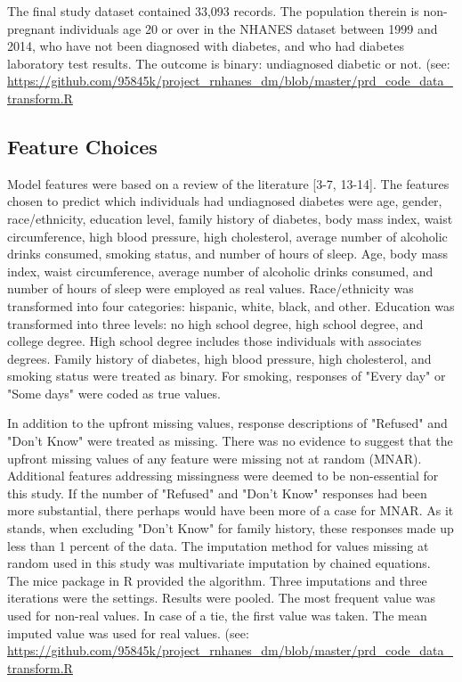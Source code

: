 \documentclass[twoside,11pt]{article}
\begin{document}
The final study dataset contained 33,093 records. The population therein is non-pregnant individuals age 20 or over in the NHANES dataset between 1999 and 2014, who have not been diagnosed with diabetes, and who had diabetes laboratory test results. The outcome is binary: undiagnosed diabetic or not. (see: \url{https://github.com/95845k/project_rnhanes_dm/blob/master/prd_code_data_transform.R}

\subsection{Feature Choices} 
Model features were based on a review of the literature [3-7, 13-14]. The features chosen to predict which individuals had undiagnosed diabetes were age, gender, race/ethnicity, education level, family history of diabetes, body mass index, waist circumference, high blood pressure, high cholesterol, average number of alcoholic drinks consumed, smoking status, and number of hours of sleep. Age, body mass index, waist circumference, average number of alcoholic drinks consumed, and number of hours of sleep were employed as real values. Race/ethnicity was transformed into four categories: hispanic, white, black, and other. Education was transformed into three levels: no high school degree, high school degree, and college degree. High school degree includes those individuals with associates degrees. Family history of diabetes, high blood pressure, high cholesterol, and smoking status were treated as binary. For smoking, responses of "Every day" or "Some days" were coded as true values. 

In addition to the upfront missing values, response descriptions of "Refused" and "Don't Know" were treated as missing. There was no evidence to suggest that the upfront missing values of any feature were missing not at random (MNAR). Additional features addressing missingness were deemed to be non-essential for this study. If the number of "Refused" and "Don't Know" responses had been more substantial, there perhaps would have been more of a case for MNAR. As it stands, when excluding "Don't Know" for family history, these responses made up less than 1 percent of the data. The imputation method for values missing at random used in this study was multivariate imputation by chained equations. The mice package in R provided the algorithm. Three imputations and three iterations were the settings. Results were pooled. The most frequent value was used for non-real values. In case of a tie, the first value was taken. The mean imputed value was used for real values. (see: \url{https://github.com/95845k/project_rnhanes_dm/blob/master/prd_code_data_transform.R}
\end{document}

